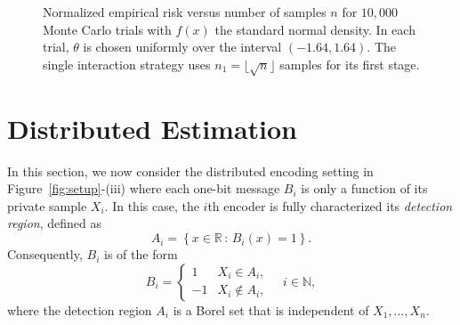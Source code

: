 \documentclass[letterpaper, 11pt]{IEEEtran}      %
\begin{document}
\begin{figure}
\begin{center}
\caption{Normalized empirical risk versus number of samples $n$ for $10,000$ Monte Carlo trials with $f(x)$ the standard normal density. In each trial, $\theta$ is chosen uniformly over the interval $(-1.64,1.64)$. The single interaction strategy uses $n_1 = \lfloor \sqrt{n} \rfloor$ samples for its first stage. 
\label{fig:adaptive_error}  }
\end{center}
\end{figure}

\section{Distributed Estimation \label{sec:distributed}}
In this section, we now consider the distributed encoding setting in Figure~\ref{fig:setup}-(iii) where  each one-bit message $B_i$ is only a function of its private sample $X_i$. In this case, the $i$th encoder is fully characterized its \emph{detection region}, defined as 
\[
A_i = \left\{ x \in \mathbb R \,:\, B_i(x) = 1 \right\}.
\]
Consequently, $B_i$ is of the form
\[
B_i = \begin{cases} 1 & X_i \in A_i, \\
-1 & X_i \notin A_i,
\end{cases} \quad i\in \mathbb N,
\]
where the detection region $A_i$ is a Borel set that is independent of $X_1,\ldots,X_n$.\par
\end{document}
